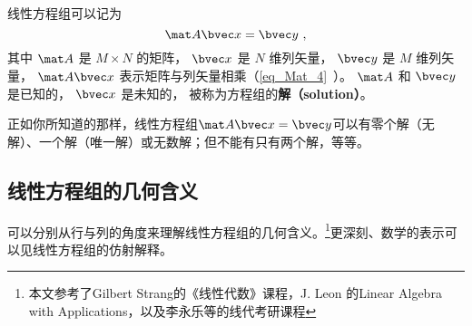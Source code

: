 
\begin{issues}
\issueDraft
\end{issues}


线性方程组可以记为
\begin{equation}\label{eq_LinEq_1}
\mat A \bvec x = \bvec y~,
\end{equation}
其中 $\mat A$ 是 $M \times N$ 的矩阵， $\bvec x$ 是 $N$ 维列矢量， $\bvec y$ 是 $M$ 维列矢量， $\mat A \bvec x$ 表示矩阵与列矢量相乘（\autoref{eq_Mat_4}~）。 $\mat A$ 和 $\bvec y$ 是已知的， $\bvec x$ 是未知的， 被称为方程组的\textbf{解（solution）}。

正如你所知道的那样，线性方程组$\mat A \bvec x=\bvec y$可以有零个解（无解）、一个解（唯一解）或无数解；但不能有只有两个解，等等。


\subsection{线性方程组的几何含义}\label{sub_LinEq_2}
可以分别从行与列的角度来理解线性方程组的几何含义。\footnote{本文参考了Gilbert Strang的《线性代数》课程，J. Leon 的Linear Algebra with Applications，以及李永乐等的线代考研课程}更深刻、数学的表示可以见线性方程组的仿射解释。

